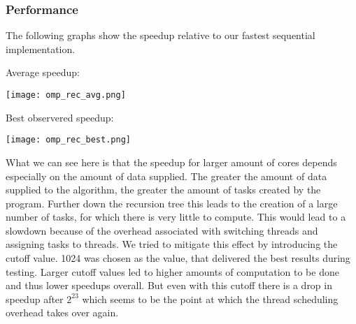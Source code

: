 \subsubsection{Performance}
The following graphs show the speedup relative to our fastest sequential implementation.

Average speedup:

\texttt{[image: omp\_rec\_avg.png]}

\pagebreak
Best observered speedup:

\texttt{[image: omp\_rec\_best.png]}

What we can see here is that the speedup for larger amount of cores depends especially on the amount of data supplied.
The greater the amount of data supplied to the algorithm, the greater the amount of tasks created by the program. Further down the recursion tree this leads to the creation of
a large number of tasks, for which there is very little to compute. This would lead to a slowdown because of the overhead associated with switching threads and assigning tasks to threads.
We tried to mitigate this effect by introducing the cutoff value. 1024 was chosen as the value, that delivered the best results during testing. Larger cutoff values led to higher amounts of computation to be done and thus lower speedups overall.
But even with this cutoff there is a drop in speedup after \(2^{23}\) which seems to be the point at which the thread scheduling overhead takes over again.
